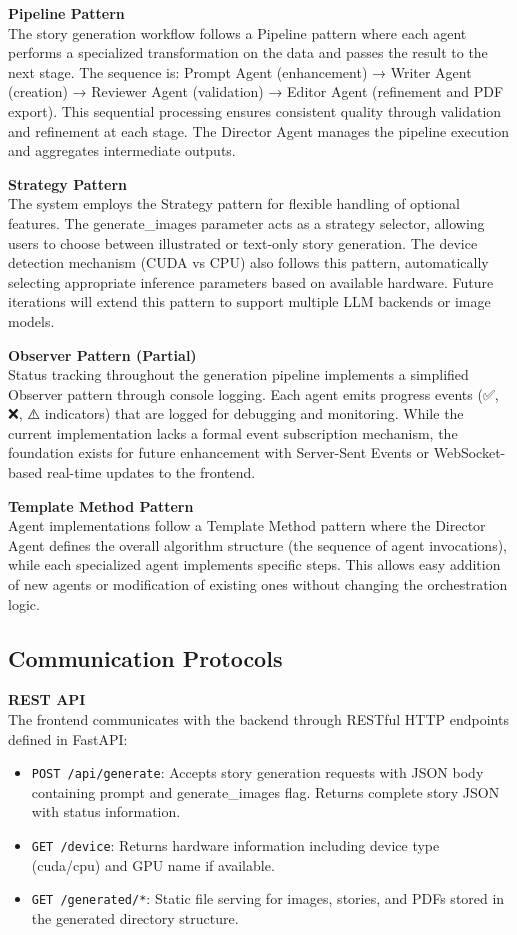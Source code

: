 \textbf{Pipeline Pattern}\\
The story generation workflow follows a Pipeline pattern where each agent performs a specialized transformation on the data and passes the result to the next stage. The sequence is: Prompt Agent (enhancement) → Writer Agent (creation) → Reviewer Agent (validation) → Editor Agent (refinement and PDF export). This sequential processing ensures consistent quality through validation and refinement at each stage. The Director Agent manages the pipeline execution and aggregates intermediate outputs.

\textbf{Strategy Pattern}\\
The system employs the Strategy pattern for flexible handling of optional features. The generate\_images parameter acts as a strategy selector, allowing users to choose between illustrated or text-only story generation. The device detection mechanism (CUDA vs CPU) also follows this pattern, automatically selecting appropriate inference parameters based on available hardware. Future iterations will extend this pattern to support multiple LLM backends or image models.

\textbf{Observer Pattern (Partial)}\\
Status tracking throughout the generation pipeline implements a simplified Observer pattern through console logging. Each agent emits progress events (✅, ❌, ⚠️ indicators) that are logged for debugging and monitoring. While the current implementation lacks a formal event subscription mechanism, the foundation exists for future enhancement with Server-Sent Events or WebSocket-based real-time updates to the frontend.

\textbf{Template Method Pattern}\\
Agent implementations follow a Template Method pattern where the Director Agent defines the overall algorithm structure (the sequence of agent invocations), while each specialized agent implements specific steps. This allows easy addition of new agents or modification of existing ones without changing the orchestration logic.

\subsection{Communication Protocols}

\textbf{REST API}\\
The frontend communicates with the backend through RESTful HTTP endpoints defined in FastAPI:
\begin{itemize}
    \item \texttt{POST /api/generate}: Accepts story generation requests with JSON body containing prompt and generate\_images flag. Returns complete story JSON with status information.
    \item \texttt{GET /device}: Returns hardware information including device type (cuda/cpu) and GPU name if available.
    \item \texttt{GET /generated/*}: Static file serving for images, stories, and PDFs stored in the generated directory structure.
\end{itemize}

